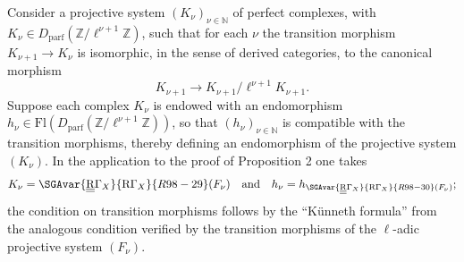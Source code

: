Consider a projective system $(K_\nu)_{\nu\in\mathbb N}$ of perfect complexes, with $K_\nu\in D_{\mathrm{parf}}(\mathbb Z/\ell^{\nu+1}\mathbb Z)$, such that for each $\nu$ the transition morphism $K_{\nu+1}\to K_\nu$ is isomorphic, in the sense of derived categories, to the canonical morphism
\[
K_{\nu+1}\to K_{\nu+1}/\ell^{\nu+1}K_{\nu+1}.
\]
Suppose each complex $K_\nu$ is endowed with an endomorphism $h_\nu\in\mathrm{Fl}(D_{\mathrm{parf}}(\mathbb Z/\ell^{\nu+1}\mathbb Z))$, so that $(h_\nu)_{\nu\in\mathbb N}$ is compatible with the transition morphisms, thereby defining an endomorphism of the projective system $(K_\nu)$. In the application to the proof of Proposition 2 one takes
\[
K_\nu=\SGAvar{\underline{\underline{\mathrm{R}}}\Gamma_X}{\mathrm{R}\Gamma_X}{R98-29}(F_\nu)\quad\text{and}\quad h_\nu=h_{\SGAvar{\underline{\underline{\mathrm{R}}}\Gamma_X}{\mathrm{R}\Gamma_X}{R98-30}(F_\nu)};
\]
the condition on transition morphisms follows by the ``Künneth formula'' from the analogous condition verified by the transition morphisms of the $\ell$-adic projective system $(F_\nu)$.

